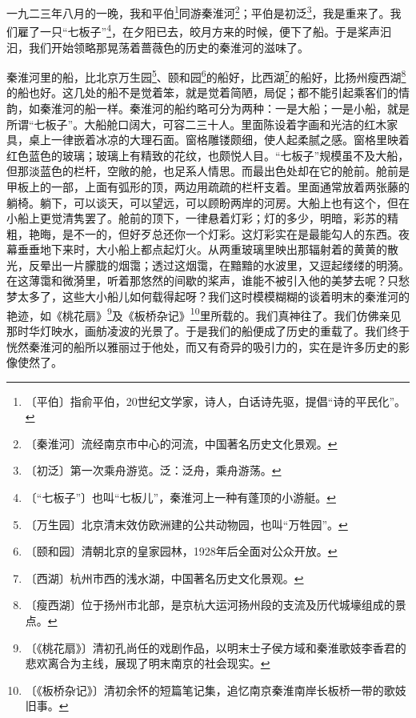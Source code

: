 \documentclass[12pt,UTF-8,openany]{ctexbook}
\begin{document}
\begin{large}
    
    一九二三年八月的一晚，我和平伯\footnote{〔平伯〕指俞平伯，20世纪文学家，诗人，白话诗先驱，提倡“诗的平民化”。}同游秦淮河\footnote{〔秦淮河〕流经南京市中心的河流，中国著名历史文化景观。}；平伯是初泛\footnote{〔初泛〕第一次乘舟游览。泛：泛舟，乘舟游荡。}，我是重来了。我们雇了一只“七板子”\footnote{〔“七板子”〕也叫“七板儿”，秦淮河上一种有蓬顶的小游艇。}，在夕阳已去，皎月方来的时候，便下了船。于是桨声汩汩，我们开始领略那晃荡着蔷薇色的历史的秦淮河的滋味了。
    
    秦淮河里的船，比北京万生园\footnote{〔万生园〕北京清末效仿欧洲建的公共动物园，也叫“万牲园”。}、颐和园\footnote{〔颐和园〕清朝北京的皇家园林，1928年后全面对公众开放。}的船好，比西湖\footnote{〔西湖〕杭州市西的浅水湖，中国著名历史文化景观。}的船好，比扬州瘦西湖\footnote{〔瘦西湖〕位于扬州市北部，是京杭大运河扬州段的支流及历代城壕组成的景点。}的船也好。这几处的船不是觉着笨，就是觉着简陋，局促；都不能引起乘客们的情韵，如秦淮河的船一样。秦淮河的船约略可分为两种：一是大船；一是小船，就是所谓“七板子”。大船舱口阔大，可容二三十人。里面陈设着字画和光洁的红木家具，桌上一律嵌着冰凉的大理石面。窗格雕镂颇细，使人起柔腻之感。窗格里映着红色蓝色的玻璃；玻璃上有精致的花纹，也颇悦人目。“七板子”规模虽不及大船，但那淡蓝色的栏杆，空敞的舱，也足系人情思。而最出色处却在它的舱前。舱前是甲板上的一部，上面有弧形的顶，两边用疏疏的栏杆支着。里面通常放着两张藤的躺椅。躺下，可以谈天，可以望远，可以顾盼两岸的河房。大船上也有这个，但在小船上更觉清隽罢了。舱前的顶下，一律悬着灯彩；灯的多少，明暗，彩苏的精粗，艳晦，是不一的，但好歹总还你一个灯彩。这灯彩实在是最能勾人的东西。夜幕垂垂地下来时，大小船上都点起灯火。从两重玻璃里映出那辐射着的黄黄的散光，反晕出一片朦胧的烟霭；透过这烟霭，在黯黯的水波里，又逗起缕缕的明漪。在这薄霭和微漪里，听着那悠然的间歇的桨声，谁能不被引入他的美梦去呢？只愁梦太多了，这些大小船儿如何载得起呀？我们这时模模糊糊的谈着明末的秦淮河的艳迹，如《桃花扇》\footnote{〔《桃花扇》〕清初孔尚任的戏剧作品，以明末士子侯方域和秦淮歌妓李香君的悲欢离合为主线，展现了明末南京的社会现实。}及《板桥杂记》\footnote{〔《板桥杂记》〕清初余怀的短篇笔记集，追忆南京秦淮南岸长板桥一带的歌妓旧事。}里所载的。我们真神往了。我们仿佛亲见那时华灯映水，画舫凌波的光景了。于是我们的船便成了历史的重载了。我们终于恍然秦淮河的船所以雅丽过于他处，而又有奇异的吸引力的，实在是许多历史的影像使然了。
    

\end{large}
\end{document}
